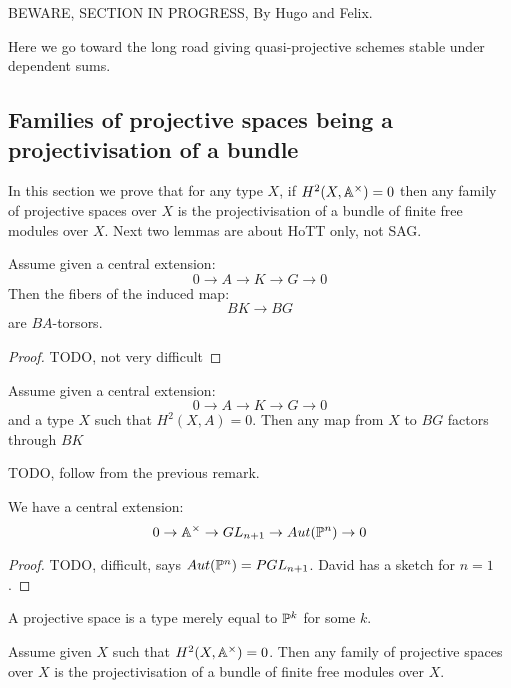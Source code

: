 
BEWARE, SECTION IN PROGRESS, By Hugo and Felix.

Here we go toward the long road giving quasi-projective schemes stable under dependent sums. 


\subsection{Families of projective spaces being a projectivisation of a bundle}

In this section we prove that for any type $X$, if $H^2(X,\mathbb{A}^\times) = 0$ then any family of projective spaces over $X$ is the projectivisation of a bundle of finite free modules over $X$. Next two lemmas are about HoTT only, not SAG.

\begin{lemma}
Assume given a central extension:
\[0 \to A \to K \to G \to 0\]
Then the fibers of the induced map:
\[BK\to BG\]
are $BA$-torsors.
\end{lemma}

\begin{proof}
TODO, not very difficult
\end{proof}

\begin{lemma}\label{trivial-cohomology-lift}
Assume given a central extension:
\[0 \to A \to K \to G \to 0\]
and a type $X$ such that $H^2(X,A)=0$. Then any map from $X$ to $BG$ factors through $BK$
\end{lemma}

\begin{lemma}
TODO, follow from the previous remark.
\end{lemma}

\begin{proposition}\label{auto-projective-central}
We have a central extension:
\[0 \to \mathbb{A}^\times \to GL_{n+1} \to Aut(\mathbb{P}^n) \to 0\]
\end{proposition}

\begin{proof}
TODO, difficult, says $Aut(\mathbb{P}^n) = PGL_{n+1}$. David has a sketch for $n=1$.
\end{proof}

A projective space is a type merely equal to $\mathbb{P}^k$ for some $k$.

\begin{corollary}\label{projective-space-are-projectivisation-bundle}
Assume given $X$ such that $H^2(X,\mathbb{A}^\times) = 0$. Then any family of projective spaces over $X$ is the projectivisation of a bundle of finite free modules over $X$.
\end{corollary}

